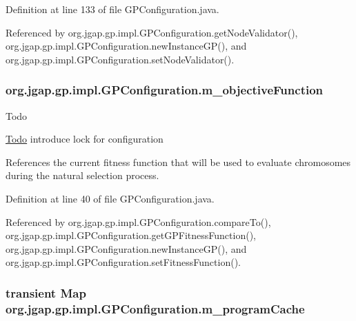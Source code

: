 Definition at line 133 of file G\-P\-Configuration.\-java.



Referenced by org.\-jgap.\-gp.\-impl.\-G\-P\-Configuration.\-get\-Node\-Validator(), org.\-jgap.\-gp.\-impl.\-G\-P\-Configuration.\-new\-Instance\-G\-P(), and org.\-jgap.\-gp.\-impl.\-G\-P\-Configuration.\-set\-Node\-Validator().

\hypertarget{classorg_1_1jgap_1_1gp_1_1impl_1_1_g_p_configuration_a620f23497a17109be4d8394cc1c541e1}{
\subsubsection[{m\-\_\-objective\-Function}]{ org.\-jgap.\-gp.\-impl.\-G\-P\-Configuration.\-m\-\_\-objective\-Function\hspace{0.3cm}{\ttfamily [private]}}}\label{classorg_1_1jgap_1_1gp_1_1impl_1_1_g_p_configuration_a620f23497a17109be4d8394cc1c541e1}
\begin{DoxyRefDesc}{Todo}
\item[\hyperlink{todo__todo000139}{Todo}]introduce lock for configuration \end{DoxyRefDesc}
References the current fitness function that will be used to evaluate chromosomes during the natural selection process. 

Definition at line 40 of file G\-P\-Configuration.\-java.



Referenced by org.\-jgap.\-gp.\-impl.\-G\-P\-Configuration.\-compare\-To(), org.\-jgap.\-gp.\-impl.\-G\-P\-Configuration.\-get\-G\-P\-Fitness\-Function(), org.\-jgap.\-gp.\-impl.\-G\-P\-Configuration.\-new\-Instance\-G\-P(), and org.\-jgap.\-gp.\-impl.\-G\-P\-Configuration.\-set\-Fitness\-Function().

\hypertarget{classorg_1_1jgap_1_1gp_1_1impl_1_1_g_p_configuration_aad38a2739615046e3bdba6b63dab534f}{
\subsubsection[{m\-\_\-program\-Cache}]{\setlength{\rightskip}{0pt plus 5cm}transient Map org.\-jgap.\-gp.\-impl.\-G\-P\-Configuration.\-m\-\_\-program\-Cache\hspace{0.3cm}{\ttfamily [private]}}}\label{classorg_1_1jgap_1_1gp_1_1impl_1_1_g_p_configuration_aad38a2739615046e3bdba6b63dab534f}


